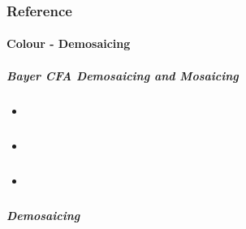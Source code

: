 \documentclass[letterpaper,10pt,english]{sphinxmanual}
\begin{document}
\subsubsection{Reference}
\label{\detokenize{reference::doc}}\label{\detokenize{reference:reference}}

\paragraph{Colour - Demosaicing}
\label{\detokenize{colour_demosaicing:colour-demosaicing}}\label{\detokenize{colour_demosaicing::doc}}

\subparagraph{Bayer CFA Demosaicing and Mosaicing}
\label{\detokenize{colour_demosaicing.bayer:bayer-cfa-demosaicing-and-mosaicing}}\label{\detokenize{colour_demosaicing.bayer::doc}}
\begin{sphinxShadowBox}
\begin{itemize}
\item {} 
\label{\detokenize{colour_demosaicing.bayer:id1}}{\hyperref[\detokenize{colour_demosaicing.bayer:demosaicing}]{}}

\item {} 
\label{\detokenize{colour_demosaicing.bayer:id2}}{\hyperref[\detokenize{colour_demosaicing.bayer:mosaicing}]{}}

\item {} 
\label{\detokenize{colour_demosaicing.bayer:id3}}{\hyperref[\detokenize{colour_demosaicing.bayer:masks}]{}}

\end{itemize}
\end{sphinxShadowBox}


\subparagraph{Demosaicing}
\label{\detokenize{colour_demosaicing.bayer:demosaicing}}
\end{document}
